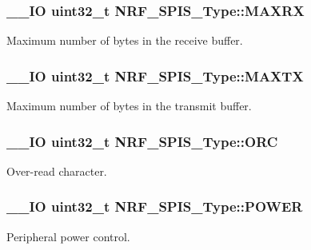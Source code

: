 \subsubsection[{M\+A\+X\+R\+X}]{\setlength{\rightskip}{0pt plus 5cm}\+\_\+\+\_\+\+I\+O uint32\+\_\+t N\+R\+F\+\_\+\+S\+P\+I\+S\+\_\+\+Type\+::\+M\+A\+X\+R\+X}\label{struct_n_r_f___s_p_i_s___type_ac25380aef8acb0d3c753fd58a3c19578}
Maximum number of bytes in the receive buffer. \hypertarget{struct_n_r_f___s_p_i_s___type_a6ecfd5f949e468fcdf914f2fa48b64bc}{}
\subsubsection[{M\+A\+X\+T\+X}]{\setlength{\rightskip}{0pt plus 5cm}\+\_\+\+\_\+\+I\+O uint32\+\_\+t N\+R\+F\+\_\+\+S\+P\+I\+S\+\_\+\+Type\+::\+M\+A\+X\+T\+X}\label{struct_n_r_f___s_p_i_s___type_a6ecfd5f949e468fcdf914f2fa48b64bc}
Maximum number of bytes in the transmit buffer. \hypertarget{struct_n_r_f___s_p_i_s___type_aa70d83790facd1d9564ee423d2927a81}{}
\subsubsection[{O\+R\+C}]{\setlength{\rightskip}{0pt plus 5cm}\+\_\+\+\_\+\+I\+O uint32\+\_\+t N\+R\+F\+\_\+\+S\+P\+I\+S\+\_\+\+Type\+::\+O\+R\+C}\label{struct_n_r_f___s_p_i_s___type_aa70d83790facd1d9564ee423d2927a81}
Over-\/read character. \hypertarget{struct_n_r_f___s_p_i_s___type_aca78c0bd9fdf802fcf55933786812097}{}
\subsubsection[{P\+O\+W\+E\+R}]{\setlength{\rightskip}{0pt plus 5cm}\+\_\+\+\_\+\+I\+O uint32\+\_\+t N\+R\+F\+\_\+\+S\+P\+I\+S\+\_\+\+Type\+::\+P\+O\+W\+E\+R}\label{struct_n_r_f___s_p_i_s___type_aca78c0bd9fdf802fcf55933786812097}
Peripheral power control. \hypertarget{struct_n_r_f___s_p_i_s___type_af0a87e8d39a0cbb664bf93fa9a0adf10}{}
